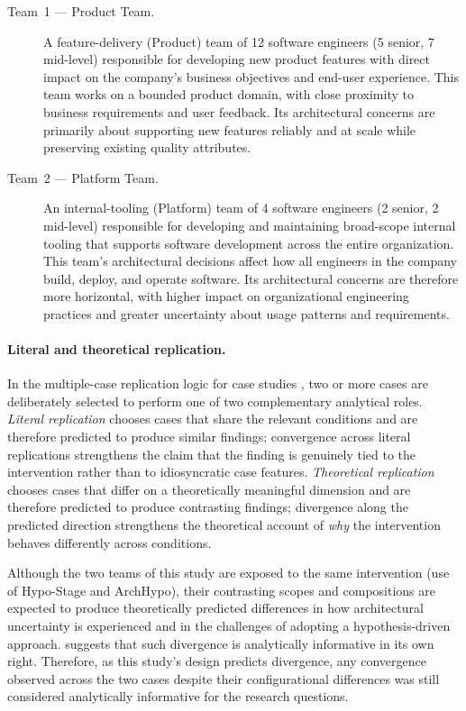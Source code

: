 \begin{description}
  \item[Team~1 --- Product Team.] A feature-delivery (Product) team of 12 software engineers (5 senior,
    7 mid-level) responsible for developing new product features with direct
    impact on the company's business objectives and end-user experience. This team
    works on a bounded product domain, with close proximity to business requirements
    and user feedback. Its architectural concerns are primarily about supporting new
    features reliably and at scale while preserving existing quality attributes.

  \item[Team~2 --- Platform Team.] An internal-tooling (Platform) team of 4 software engineers (2 senior,
    2 mid-level) responsible for developing and maintaining broad-scope internal
    tooling that supports software development across the entire organization. This
    team's architectural decisions affect how all engineers in the company build,
    deploy, and operate software. Its architectural concerns are therefore more
    horizontal, with higher impact on organizational engineering practices and
    greater uncertainty about usage patterns and requirements.
\end{description}

\paragraph{Literal and theoretical replication.} In the multiple-case replication logic for case studies \citep{yin2009}, two or more cases are deliberately selected to perform one of
two complementary analytical roles. \emph{Literal replication} chooses cases
that share the relevant conditions and are therefore predicted to produce
similar findings; convergence across literal replications strengthens the
claim that the finding is genuinely tied to the intervention rather than to
idiosyncratic case features. \emph{Theoretical replication} chooses cases
that differ on a theoretically meaningful dimension and are therefore
predicted to produce contrasting findings; divergence along the predicted
direction strengthens the theoretical account of \emph{why} the intervention
behaves differently across conditions.

Although the two teams of this study are exposed to the same intervention (use of Hypo-Stage and ArchHypo),
their contrasting scopes and compositions are expected to produce theoretically predicted
differences in how architectural uncertainty is experienced and in the challenges of
adopting a hypothesis-driven approach. \citet{robson2016} suggests that such divergence is analytically informative in its own right.
Therefore, as this study's design predicts divergence, any convergence observed across
the two cases despite their configurational differences was still considered analytically informative for the research questions.

